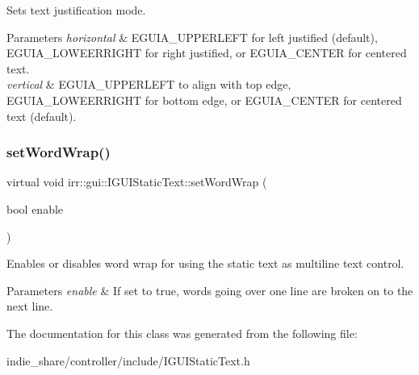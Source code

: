 Sets text justification mode. 


\begin{DoxyParams}{Parameters}
{\em horizontal} & E\+G\+U\+I\+A\+\_\+\+U\+P\+P\+E\+R\+L\+E\+FT for left justified (default), E\+G\+U\+I\+A\+\_\+\+L\+O\+W\+E\+E\+R\+R\+I\+G\+HT for right justified, or E\+G\+U\+I\+A\+\_\+\+C\+E\+N\+T\+ER for centered text. \\
\hline
{\em vertical} & E\+G\+U\+I\+A\+\_\+\+U\+P\+P\+E\+R\+L\+E\+FT to align with top edge, E\+G\+U\+I\+A\+\_\+\+L\+O\+W\+E\+E\+R\+R\+I\+G\+HT for bottom edge, or E\+G\+U\+I\+A\+\_\+\+C\+E\+N\+T\+ER for centered text (default). \\
\hline
\end{DoxyParams}
\mbox{\label{classirr_1_1gui_1_1IGUIStaticText_a2a47bc2f85ced3efc1d007c5bd61f906}} 
\subsubsection{\texorpdfstring{set\+Word\+Wrap()}{setWordWrap()}}
{\footnotesize\ttfamily virtual void irr\+::gui\+::\+I\+G\+U\+I\+Static\+Text\+::set\+Word\+Wrap (\begin{DoxyParamCaption}\item[{bool}]{enable }\end{DoxyParamCaption})\hspace{0.3cm}{\ttfamily [pure virtual]}}



Enables or disables word wrap for using the static text as multiline text control. 


\begin{DoxyParams}{Parameters}
{\em enable} & If set to true, words going over one line are broken on to the next line. \\
\hline
\end{DoxyParams}


The documentation for this class was generated from the following file\+:\begin{DoxyCompactItemize}
\item 
indie\+\_\+share/controller/include/I\+G\+U\+I\+Static\+Text.\+h\end{DoxyCompactItemize}
